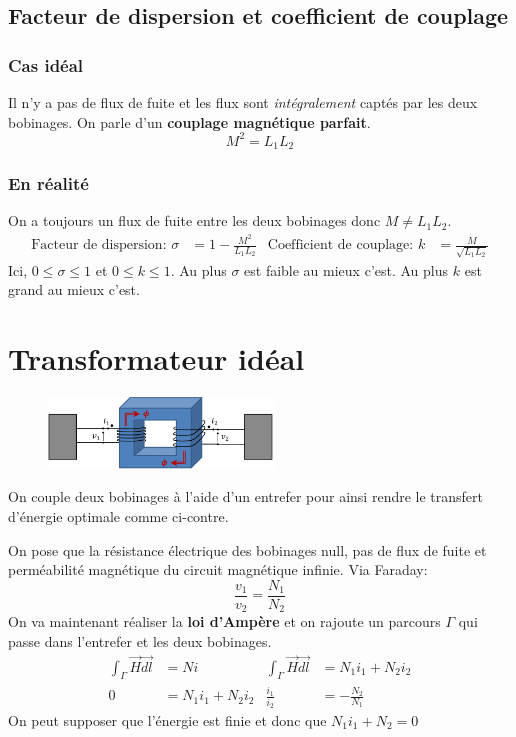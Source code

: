 \documentclass{report}
\begin{document}
\subsection{Facteur de dispersion et coefficient de couplage}
\subsubsection{Cas idéal}
Il n'y a pas de flux de fuite et les flux sont \textit{intégralement} captés par les deux bobinages. On parle d'un \textbf{couplage magnétique parfait}.
\begin{equation}
M^2 = L_1 L_2
\end{equation}

\subsubsection{En réalité}
On a toujours un flux de fuite entre les deux bobinages donc $M \neq L_1 L_2$.
\begin{align*}
\text{Facteur de dispersion: } \sigma &= 1 - \frac{M^2}{L_1 L_2} & \text{Coefficient de couplage: } k &= \frac{M}{\sqrt{L_1 L_2}}
\end{align*}
Ici, $0 \leqslant \sigma \leqslant 1$ et $0 \leqslant k \leqslant 1$. Au plus $\sigma$ est faible au mieux c'est. Au plus $k$ est grand au mieux c'est.

\section{Transformateur idéal}
\begin{figure}
\centering
\includegraphics[width=6cm]{img/transfoBobinages.png}
\end{figure}
On couple deux bobinages à l'aide d'un entrefer pour ainsi rendre le transfert d'énergie optimale comme ci-contre.\par
On pose que la résistance électrique des bobinages null, pas de flux de fuite et perméabilité magnétique du circuit magnétique infinie. Via Faraday:
\begin{equation}
\frac{v_1}{v_2} = \frac{N_1}{N_2}
\end{equation}
On va maintenant réaliser la \textbf{loi d'Ampère} et on rajoute un parcours $\Gamma$ qui passe dans l'entrefer et les deux bobinages.
\begin{align*}
\int_{\Gamma} \overrightarrow{H} \overrightarrow{dl} &= N i & \int_{\Gamma} \overrightarrow{H} \overrightarrow{dl} &= N_1 i_1 + N_2 i_2\\
0 &= N_1 i_1 + N_2 i_2 & \frac{i_1}{i_2} &= - \frac{N_2}{N_1}
\end{align*}
On peut supposer que l'énergie est finie et donc que $N_1 i_1 + N_2 = 0$
\end{document}
